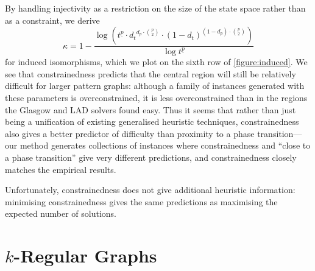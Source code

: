 \documentclass[twoside,11pt]{article}
\begin{document}
By handling injectivity as a
restriction on the size of the state space rather than as a constraint, we derive
\begin{equation}\label{equation:constrainedness}\kappa = 1 - \frac{\log \left( t^{\underline{p}}
\cdot {d_t}^{d_p \cdot \binom{p}{2}} \cdot {(1 - d_{t})}^{(1 - d_{p}) \cdot \binom{p}{2}}
\right)}{\log t^{\underline{p}}} \end{equation} for induced isomorphisms, which we plot on the sixth
row of \cref{figure:induced}. We see that constrainedness predicts that the central region will
still be relatively difficult for larger pattern graphs: although a family of instances generated
with these parameters is overconstrained, it is less overconstrained than in the regions the Glasgow
and LAD solvers found easy.  Thus it seems that rather than just being a unification of existing
generalised heuristic techniques, constrainedness also gives a better predictor of difficulty than
proximity to a phase transition---our method generates collections of instances where
constrainedness and ``close to a phase transition'' give very different predictions, and
constrainedness closely matches the empirical results.

Unfortunately, constrainedness does not give additional heuristic information: minimising
constrainedness gives the same predictions as maximising the expected number of solutions.

\section{$k$-Regular Graphs}\label{section:regular}
\end{document}
